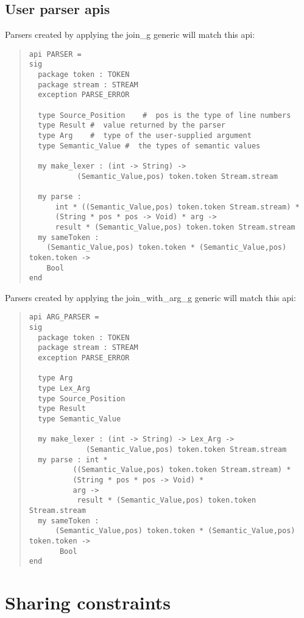 \subsection{User parser apis}

Parsers created by applying the join_g generic will match this api:
\begin{quote}
\begin{verbatim}
api PARSER =
sig
  package token : TOKEN
  package stream : STREAM
  exception PARSE_ERROR

  type Source_Position    #  pos is the type of line numbers 
  type Result #  value returned by the parser 
  type Arg    #  type of the user-supplied argument  
  type Semantic_Value #  the types of semantic values 

  my make_lexer : (int -> String) ->
		   (Semantic_Value,pos) token.token Stream.stream

  my parse :
      int * ((Semantic_Value,pos) token.token Stream.stream) *
      (String * pos * pos -> Void) * arg ->
	  result * (Semantic_Value,pos) token.token Stream.stream
  my sameToken :
    (Semantic_Value,pos) token.token * (Semantic_Value,pos) token.token ->
	Bool
end
\end{verbatim}
\end{quote}
Parsers created by applying the join_with_arg_g generic will match this
api:
\begin{quote}
\begin{verbatim}
api ARG_PARSER = 
sig
  package token : TOKEN
  package stream : STREAM
  exception PARSE_ERROR

  type Arg
  type Lex_Arg
  type Source_Position
  type Result
  type Semantic_Value

  my make_lexer : (int -> String) -> Lex_Arg ->
		     (Semantic_Value,pos) token.token Stream.stream
  my parse : int *
	      ((Semantic_Value,pos) token.token Stream.stream) *
	      (String * pos * pos -> Void) *
	      arg ->
	       result * (Semantic_Value,pos) token.token Stream.stream
  my sameToken :
      (Semantic_Value,pos) token.token * (Semantic_Value,pos) token.token ->
	   Bool
end
\end{verbatim}
\end{quote}

\section{Sharing constraints}

